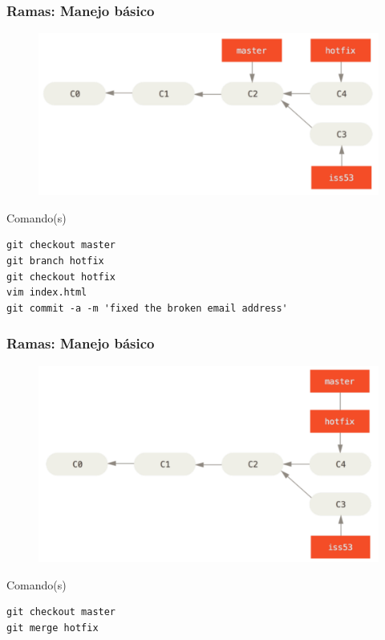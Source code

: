 \documentclass{beamer}
\begin{document}
\begin{frame}[fragile]
\frametitle{Ramas: Manejo básico}
\begin{figure}
\includegraphics[width=0.70\linewidth]{img/branching-4.png}
\end{figure}
\vskip 0.10cm
\scriptsize
\begin{block}{Comando(s)}
\begin{verbatim}
git checkout master
git branch hotfix
git checkout hotfix
vim index.html
git commit -a -m 'fixed the broken email address'
\end{verbatim}
\end{block}
\end{frame}

\begin{frame}[fragile]
\frametitle{Ramas: Manejo básico}
\begin{figure}
\includegraphics[width=0.70\linewidth]{img/branching-5.png}
\end{figure}
\vskip 0.30cm
\footnotesize
\begin{block}{Comando(s)}
\begin{verbatim}
git checkout master
git merge hotfix
\end{verbatim}
\end{block}
\end{frame}
\end{document}
